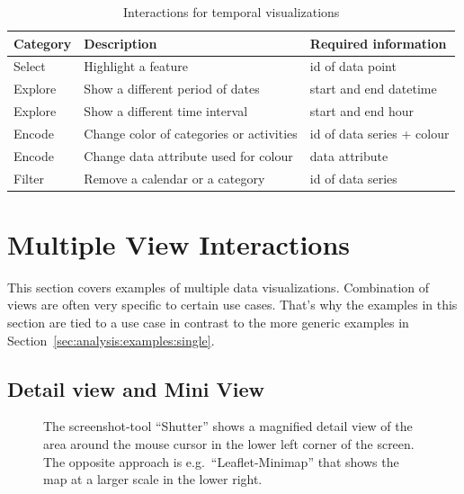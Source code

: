 
\begin{table}
  \caption{Interactions for temporal visualizations}%
  \label{fig:analysis:temporal:interactions}
  \begin{tabular*}{\textwidth}{lll}
    \bf Category & \bf Description & \bf Required information \\
    \hline
    Select & Highlight a feature & id of data point \\
    Explore & Show a different period of dates & start and end datetime \\
    Explore & Show a different time interval & start and end hour\\
    Encode & Change color of categories or activities & id of data series + colour \\
    Encode & Change data attribute used for colour & data attribute \\
    Filter & Remove a calendar or a category & id of data series \\
  \end{tabular*}
\end{table}

\section{Multiple View Interactions}\label{sec:analysis:examples:multiple}

This section covers examples of multiple data visualizations.
Combination of views are often very specific to certain use cases.
That's why the examples in this section are tied to a use case in contrast to the more generic examples in Section~\ref{sec:analysis:examples:single}.


\subsection{Detail view and Mini View}
\begin{figure}
  \centering
  \caption{
    The screenshot-tool ``Shutter'' shows a magnified detail view of the area around the mouse cursor in the lower left corner of the screen.
  The opposite approach is e.g.\ ``Leaflet-Minimap'' that shows the map at a larger scale in the lower right.
  }
  \label{fig:analysis:detail}
  \qquad
\end{figure}

